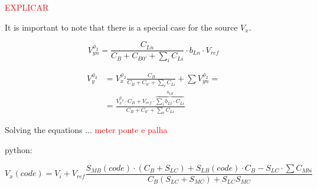 \textcolor{red}{EXPLICAR}

It is important to note that there is a special case for the source $V_x$. 

\begin{equation}
    V_{yn}^{\phi_2} = \frac{C_{Ln}}{\displaystyle C_B + C_{B0'}+\sum_i C_{Li}}\cdot b_{Ln}\cdot V_{ref}
\end{equation}

\begin{equation}
    \begin{split}
        V_y^{\phi_2} &= V_x^{\phi_2}\frac{C_B}{C_B + C_{0'}+\sum_i C_{Li}} + \sum V_{yn}^{\phi_2} =\\
        &= \frac{ V_x^{\phi_2}\cdot C_B + V_{ref}\cdot \overbrace{\sum_i b_{Li}\cdot C_{Li}}^{S_{LB}}}{ C_B + C_{0'}+\sum_i C_{Li}}
    \end{split}
    \label{eq:Vy}
\end{equation}

Solving the equations ... \textcolor{red}{meter ponte e palha}

python:

\begin{equation}
    \boxed{ V_x(code) = V_{i}  + V_{ref}\frac{ S_{MB}(code)\cdot(C_B+S_{LC})+S_{LB}(code)\cdot C_B  - S_{LC}\cdot\sum C_{Mbi}}{C_{B} ( S_{LC} + S_{MC}) + S_{LC} S_{MC}}}
    \label{eq:VxFinal}
\end{equation}
